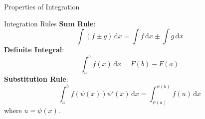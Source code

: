 \documentclass[10pt, aspectratio=1610]{beamer}
\begin{document}
\begin{frame}{Properties of Integration}\label{slide:3}
  \begin{block}{Integration Rules}
    \textbf{Sum Rule}: 
    \[\int (f\pm g)\,\mathrm{d}x = \int f\,\mathrm{d}x\pm \int g\,\mathrm{d}x\]
    \textbf{Definite Integral}: 
    \[\int_{a}^b f(x)\,\mathrm{d}x=F(b)-F(a)\]
    \textbf{Substitution Rule}: 
    \[\int_{a}^{b} f(\psi(x))\psi'(x)\,\mathrm{d}x = \int_{\psi(a)}^{\psi(b)} f(u)\,\mathrm{d}x\]
    where $u=\psi(x)$.
  \end{block}
  \begin{tcolorbox}[width=\linewidth,sharp corners=downhill,arc=3mm,boxrule=1mm,
    colback=white,colframe=cyan,
    title style={left color=black,right color=cyan},halign=center,valign=center,sidebyside]
    \hyperlink{slide:5}{}
    \tcblower
    \hyperlink{slide:1}{}
  \end{tcolorbox}
\end{frame}
\end{document}
